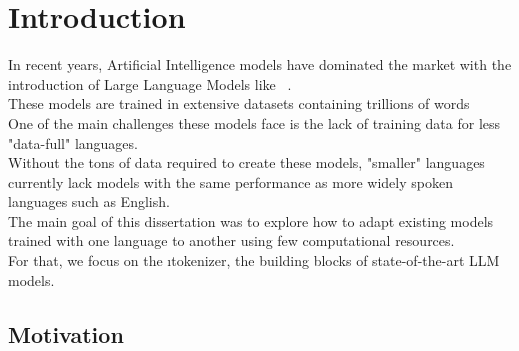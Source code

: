 
\chapter{Introduction}


\label{Section1}

In recent years, Artificial Intelligence models have dominated the market with the introduction of Large Language Models like ~\cite{Chat-GPT}.\\
These models are trained in extensive datasets containing trillions of words\\
One of the main challenges these models face is the lack of training data for less "data-full" languages.\\
Without the tons of data required to create these models, "smaller" languages currently lack models with the same performance as more widely spoken languages such as English.\\
The main goal of this dissertation was to explore how to adapt existing models trained with one language to another using few computational resources.\\
For that, we focus on the \i{tokenizer}, the building blocks of state-of-the-art LLM models.

\section{Motivation}\label{Section1.1}



